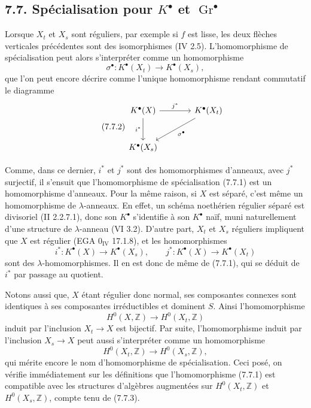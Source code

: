 \documentclass[11pt]{article}
\newcommand{\Gr}{\operatorname{Gr}}
\providecommand{\Gr}{\operatorname{Gr}}
\providecommand{\Gr}{\operatorname{G}}
\begin{document}
\subsection*{7.7. Spécialisation pour \(K^\bullet\) et \(\Gr^\bullet\)}
Lorsque \(X_t\) et \(X_s\) sont réguliers, par exemple si \(f\) est lisse, les deux flèches verticales précédentes sont des isomorphismes (IV 2.5). L'homomorphisme de spécialisation peut alors s'interpréter comme un homomorphisme
\begin{equation}\tag{7.7.1}
  \sigma^\bullet:K^\bullet(X_t)\longrightarrow K^\bullet(X_s),
\end{equation}
que l'on peut encore décrire comme l'unique homomorphisme rendant commutatif le diagramme
\begin{equation}\tag{7.7.2}
\begin{tikzcd}[column sep=large,row sep=large]
K^\bullet(X) \arrow[r,"j^*"] \arrow[d,"i^*"'] & K^\bullet(X_t) \arrow[dl,"\sigma^\bullet"]\\
K^\bullet(X_s) &
\end{tikzcd}
\end{equation}

Comme, dans ce dernier, \(i^*\) et \(j^*\) sont des homomorphismes d'anneaux, avec \(j^*\) surjectif, il s'ensuit que l'homomorphisme de spécialisation (7.7.1) est un homomorphisme d'anneaux. Pour la même raison, si \(X\) est séparé, c'est même un homomorphisme de \(\lambda\)-anneaux. En effet, un schéma noethérien régulier séparé est divisoriel (II 2.2.7.1), donc son \(K^\bullet\) s'identifie à son \(K^\bullet\) naïf, muni naturellement d'une structure de \(\lambda\)-anneau (VI 3.2). D'autre part, \(X_t\) et \(X_s\) réguliers impliquent que \(X\) est régulier (EGA \(0_{\mathrm{IV}}\) 17.1.8), et les homomorphismes
\[
  i^*:K^\bullet(X)\to K^\bullet(X_s),\qquad
  j^*:K^\bullet(X)\to K^\bullet(X_t)
\]
sont des \(\lambda\)-homomorphismes. Il en est donc de même de (7.7.1), qui se déduit de \(i^*\) par passage au quotient.

Notons aussi que, \(X\) étant régulier donc normal, ses composantes connexes sont identiques à ses composantes irréductibles et dominent \(S\). Ainsi l'homomorphisme
\[
  H^0(X,\mathbb Z)\longrightarrow H^0(X_t,\mathbb Z)
\]
induit par l'inclusion \(X_t\to X\) est bijectif. Par suite, l'homomorphisme induit par l'inclusion \(X_s\to X\) peut aussi s'interpréter comme un homomorphisme
\begin{equation}\tag{7.7.3}
  H^0(X_t,\mathbb Z)\longrightarrow H^0(X_s,\mathbb Z),
\end{equation}
qui mérite encore le nom d'homomorphisme de spécialisation. Ceci posé, on vérifie immédiatement sur les définitions que l'homomorphisme (7.7.1) est compatible avec les structures d'algèbres augmentées sur \(H^0(X_t,\mathbb Z)\) et \(H^0(X_s,\mathbb Z)\), compte tenu de (7.7.3).
\end{document}
